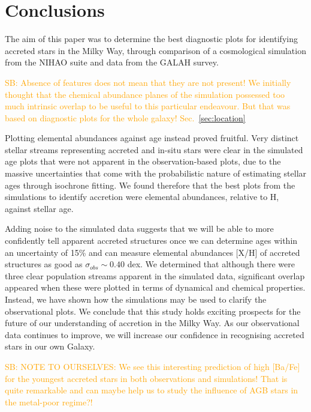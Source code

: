 \documentclass[fleqn,usenatbib]{mnras}
\newcommand{\SB}[1]{{\textcolor{orange}{SB: #1}}}
\begin{document}

\section{Conclusions}
\label{sec:conc}

The aim of this paper was to determine the best diagnostic plots for identifying accreted stars in the Milky Way, through comparison of a cosmological simulation from the NIHAO suite and data from the GALAH survey. 

\SB{Absence of features does not mean that they are not present! We initially thought that the chemical abundance planes of the simulation possessed too much intrinsic overlap to be useful to this particular endeavour. But that was based on diagnostic plots for the whole galaxy! Sec.~\ref{sec:location}}

Plotting elemental abundances against age instead proved fruitful. Very distinct stellar streams representing accreted and in-situ stars were clear in the simulated age plots that were not apparent in the observation-based plots, due to the massive uncertainties that come with the probabilistic nature of estimating stellar ages through isochrone fitting. We found therefore that the best plots from the simulations to identify accretion were elemental abundances, relative to H, against stellar age. \par 
Adding noise to the simulated data suggests that we will be able to more confidently tell apparent accreted structures once we can determine ages within an uncertainty of 15\% and can measure elemental abundances [X/H] of accreted structures as good as $\sigma_{obs}\sim0.40$ dex. We determined that although there were three clear population streams apparent in the simulated data, significant overlap appeared when these were plotted in terms of dynamical and chemical properties. Instead, we have shown how the simulations may be used to clarify the observational plots. We conclude that this study holds exciting prospects for the future of our understanding of accretion in the Milky Way. As our observational data continues to improve, we will increase our confidence in recognising accreted stars in our own Galaxy. 

\SB{NOTE TO OURSELVES: We see this interesting prediction of high [Ba/Fe] for the youngest accreted stars in both observations and simulations! That is quite remarkable and can maybe help us to study the influence of AGB stars in the metal-poor regime?!}
\end{document}

